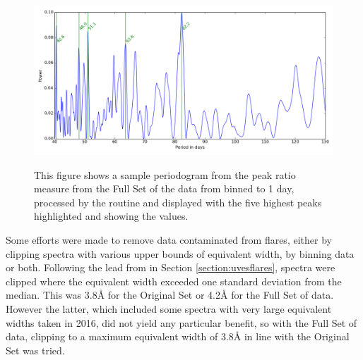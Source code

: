 \begin{figure}[!htbp]
\begin{center}
\includegraphics[scale=0.40]{Figures/harpsprbind1.png} \\
\end{center}   
\caption{This figure shows a sample periodogram from the peak ratio measure from the Full Set of the data from {\harps}
  binned to 1 day, processed by the {\gatspy} routine and displayed with the five highest peaks highlighted and showing
  the values. }
\protect\label{fig:harpspgrams2}
\end{figure}

Some efforts were made to remove data contaminated from flares, either by clipping spectra with various upper bounds of
equivalent width, by binning data or both. Following the lead from {\uves} in Section \ref{section:uvesflares}, spectra
were clipped where the equivalent width exceeded one standard deviation from the median. This was 3.8{\AA} for the
Original Set or 4.2{\AA} for the Full Set of data. However the latter, which included some spectra with very large
equivalent widths taken in 2016, did not yield any particular benefit, so with the Full Set of data, clipping to a
maximum equivalent width of 3.8{\AA} in line with the Original Set was tried. 

